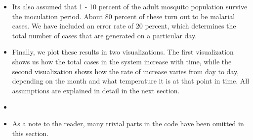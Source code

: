 \documentclass[fontsize=11pt]{article}
\begin{document}
\begin{itemize}
        \item Its also assumed that 1 - 10 percent of the adult mosquito population survive the inoculation period. About 80 percent of these turn out to be malarial cases. We have included an error rate of 20 percent, which determines the total number of cases that are generated on a particular day.

        \item Finally, we plot these results in two visualizations. The first visualization shows us how the total cases in the system increase with time, while the second visualization shows how the rate of increase varies from day to day, depending on the month and what temperature it is at that point in time. All assumptions are explained in detail in the next section.

        \item \item As a note to the reader, many trivial parts in the code have been omitted in this section.
    \end{itemize}
\end{document}
